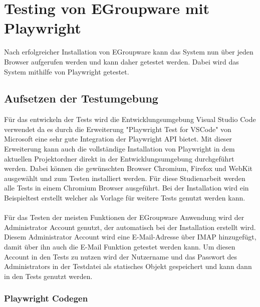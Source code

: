 \chapter{Testing von EGroupware mit Playwright}

Nach erfolgreicher Installation von EGroupware kann das System nun über jeden Browser aufgerufen werden und kann daher getestet werden.
Dabei wird das System mithilfe von Playwright getestet.

\section{Aufsetzen der Testumgebung}

Für das entwickeln der Tests wird die Entwicklungsumgebung Visual Studio Code verwendet da es durch die Erweiterung "Playwright Test for VSCode" von Microsoft eine sehr gute Integration der Playwright API bietet.
Mit dieser Erweiterung kann auch die vollständige Installation von Playwright in dem aktuellen Projektordner direkt in der Entwicklungsumgebung durchgeführt werden.
Dabei können die gewünschten Browser Chromium, Firefox und WebKit ausgewählt und zum Testen installiert werden.
Für diese Studienarbeit werden alle Tests in einem Chromium Browser ausgeführt.
Bei der Installation wird ein Beispieltest erstellt welcher als Vorlage für weitere Tests genutzt werden kann.
\\
\\
Für das Testen der meisten Funktionen der EGroupware Anwendung wird der Administrator Account genutzt, der automatisch bei der Installation erstellt wird.
Diesem Administrator Account wird eine E-Mail-Adresse über IMAP hinzugefügt, damit über ihn auch die E-Mail Funktion getestet werden kann.
Um diesen Account in den Tests zu nutzen wird der Nutzername und das Passwort des Administrators in der Testdatei als statisches Objekt gespeichert und kann dann in den Tests genutzt werden.

\subsection{Playwright Codegen}

